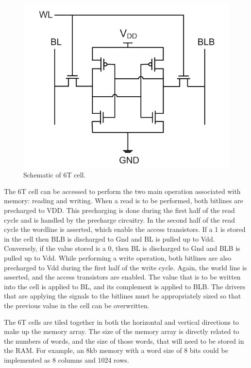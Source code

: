 \begin{figure}[h!]
\centering
\includegraphics[scale=.9]{./figs/cell_6t_schem.pdf}
\caption{Schematic of 6T cell.}
\label{fig:6t_cell}
\end{figure}

The 6T cell can be accessed to perform the two main operation
associated with memory: reading and writing.  When a read is to be
performed, both bitlines are precharged to VDD.  This precharging is
done during the first half of the read cycle and is handled by the
precharge circuitry.  In the second half of the read cycle the
wordline is asserted, which enable the access transistors.  If a 1 is
stored in the cell then BLB is discharged to Gnd and BL is pulled up
to Vdd.  Conversely, if the value stored is a 0, then BL is discharged
to Gnd and BLB is pulled up to Vdd.  While performing a write
operation, both bitlines are also precharged to Vdd during the first
half of the write cycle.  Again, the world line is asserted, and the
access transistors are enabled.  The value that is to be written into
the cell is applied to BL, and its complement is applied to BLB.  The
drivers that are applying the signals to the bitlines must be
appropriately sized so that the previous value in the cell can be
overwritten.

The 6T cells are tiled together in both the horizontal and vertical
directions to make up the memory array.  The size of the memory array
is directly related to the numbers of words, and the size of those
words, that will need to be stored in the RAM.  For example, an 8kb
memory with a word size of 8 bits could be implemented as 8 columns
and 1024 rows.  

